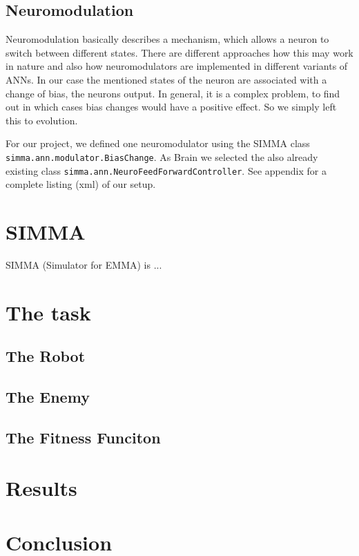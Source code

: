 \documentclass[12pt,fleqn,a4paper]{article}
\begin{document}
\subsection{Neuromodulation}
Neuromodulation basically describes a mechanism, which allows a neuron to switch between different states. There are different approaches how this may work in nature and also how neuromodulators are implemented in different variants of ANNs. In our case the mentioned states of the neuron are associated with a change of bias, the neurons output. In general, it is a complex problem, to find out in which cases bias changes would have a positive effect. So we simply left this to evolution.

For our project, we defined one neuromodulator using the SIMMA class\\ \texttt{simma.ann.modulator.BiasChange}. As Brain we selected the also already existing class \texttt{simma.ann.NeuroFeedForwardController}. See appendix for a complete listing (xml) of our setup.


\section{SIMMA}
SIMMA (Simulator for EMMA) is ...

\section{The task}

\subsection{The Robot}

\subsection{The Enemy}

\subsection{The Fitness Funciton}

\section{Results}

\section{Conclusion}
\end{document}
